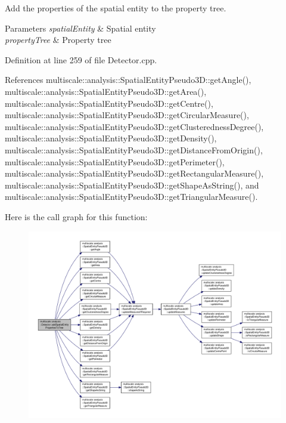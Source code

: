 Add the properties of the spatial entity to the property tree. 


\begin{DoxyParams}{Parameters}
{\em spatial\-Entity} & Spatial entity \\
\hline
{\em property\-Tree} & Property tree \\
\hline
\end{DoxyParams}


Definition at line 259 of file Detector.\-cpp.



References multiscale\-::analysis\-::\-Spatial\-Entity\-Pseudo3\-D\-::get\-Angle(), multiscale\-::analysis\-::\-Spatial\-Entity\-Pseudo3\-D\-::get\-Area(), multiscale\-::analysis\-::\-Spatial\-Entity\-Pseudo3\-D\-::get\-Centre(), multiscale\-::analysis\-::\-Spatial\-Entity\-Pseudo3\-D\-::get\-Circular\-Measure(), multiscale\-::analysis\-::\-Spatial\-Entity\-Pseudo3\-D\-::get\-Clusteredness\-Degree(), multiscale\-::analysis\-::\-Spatial\-Entity\-Pseudo3\-D\-::get\-Density(), multiscale\-::analysis\-::\-Spatial\-Entity\-Pseudo3\-D\-::get\-Distance\-From\-Origin(), multiscale\-::analysis\-::\-Spatial\-Entity\-Pseudo3\-D\-::get\-Perimeter(), multiscale\-::analysis\-::\-Spatial\-Entity\-Pseudo3\-D\-::get\-Rectangular\-Measure(), multiscale\-::analysis\-::\-Spatial\-Entity\-Pseudo3\-D\-::get\-Shape\-As\-String(), and multiscale\-::analysis\-::\-Spatial\-Entity\-Pseudo3\-D\-::get\-Triangular\-Measure().



Here is the call graph for this function\-:
\nopagebreak
\begin{figure}[H]
\begin{center}
\leavevmode
\includegraphics[width=350pt]{classmultiscale_1_1analysis_1_1Detector_ac0e3077d43c329e409db504bf3981c3c_cgraph}
\end{center}
\end{figure}


